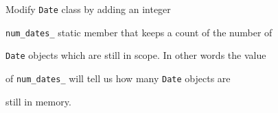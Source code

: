 Modify \texttt{Date} class by adding an integer

\texttt{num\_dates\_} static member that keeps a count of the number of

\texttt{Date} objects which are still in scope. In other words the value

of \texttt{num\_dates\_} will tell us how many \texttt{Date} objects are

still in memory.

